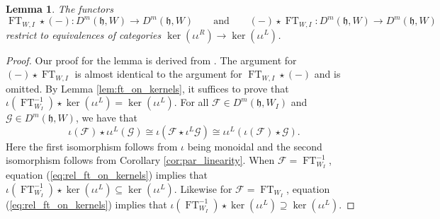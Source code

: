 \documentclass{amsart}
\newcommand{\scrF}{\mathcal{F}}
\newcommand{\scrG}{\mathcal{G}}
\newcommand{\BE}{D^m}
\newcommand{\fr}[1]{\mathfrak{#1}}
\newtheorem{lemma}{Lemma}[section]
\theoremstyle{definition}
\DeclareMathOperator{\FT}{FT}
\begin{document}
        \begin{lemma}\label{lem:rel_ft_on_kernels}
                The functors 
                \[\FT_{W, I} \star (-) : \BE (\fr{h}, W) \to \BE (\fr{h}, W) \qquad\text{and}\qquad (-) \star \FT_{W, I} : \BE (\fr{h}, W) \to \BE (\fr{h}, W)\]
                restrict to equivalences of categories $\ker (\iota \iota^R) \to \ker (\iota \iota^L)$.
        \end{lemma}
        \begin{proof}
                Our proof for the lemma is derived from \cite[Proposition 3.1.1]{HLold}.
                 The argument for $(-) \star \FT_{W, I}$ is almost identical to the argument for $\FT_{W, I} \star (-)$ and is omitted.
                By Lemma \ref{lem:ft_on_kernels}, it suffices to prove that $\iota (\FT_{W_I}^{-1}) \star \ker (\iota \iota^L) = \ker (\iota \iota^L)$.
                For all $\scrF \in \BE (\fr{h}, W_I)$ and $\scrG \in \BE (\fr{h}, W)$, we have that 
                \begin{equation}\label{eq:rel_ft_on_kernels}
                        \iota (\scrF) \star \iota \iota^L (\scrG) \cong \iota (\scrF \star \iota^L \scrG) \cong \iota \iota^L (\iota (\scrF) \star \scrG).
                \end{equation}
                Here the first isomorphism follows from $\iota$ being monoidal and the second isomorphism follows from Corollary \ref{cor:par_linearity}.
                When $\scrF = \FT_{W_I}^{-1}$, equation (\ref{eq:rel_ft_on_kernels}) implies that $\iota (\FT_{W_I}^{-1}) \star \ker (\iota \iota^L) \subseteq \ker (\iota \iota^L)$.
                Likewise for $\scrF = \FT_{W_I}$, equation (\ref{eq:rel_ft_on_kernels}) implies that $\iota (\FT_{W_I}^{-1}) \star \ker (\iota \iota^L) \supseteq \ker (\iota \iota^L)$.
        \end{proof}
\end{document}
